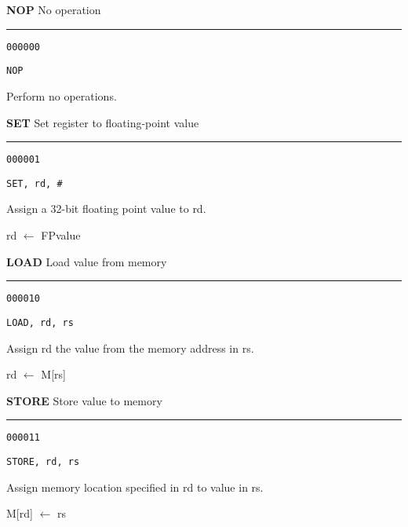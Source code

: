 \documentclass{article}
\begin{document}
\pagebreak


\flushleft
\LARGE\textbf{NOP} \large \hfill No operation

\kern-3pt
\noindent\rule{16.5cm}{0.4pt}
\normalsize

{\large
	 \texttt{000000} \par
	\smallbreak
	 \texttt{NOP} \par
	\smallbreak
	 Perform no operations. \par
}

\bigskip\bigskip

\flushleft
\LARGE\textbf{SET} \large \hfill Set register to floating-point value

\kern-3pt
\noindent\rule{16.5cm}{0.4pt}
\normalsize

{\large
	 \texttt{000001} \par
	\smallbreak
	 \texttt{SET, rd, \#<32-bit FP value>} \par
	\smallbreak
	 Assign a 32-bit floating point value to rd. \par
	\smallbreak
	 rd $\leftarrow$ FPvalue \par
}

\bigskip\bigskip

\flushleft
\LARGE\textbf{LOAD} \large \hfill Load value from memory

\kern-3pt
\noindent\rule{16.5cm}{0.4pt}
\normalsize

{\large
	 \texttt{000010} \par
	\smallbreak
	 \texttt{LOAD, rd, rs} \par
	\smallbreak
	 Assign rd the value from the memory address in rs. \par
	\smallbreak
	 rd $\leftarrow$ M[rs] \par
}

\bigskip\bigskip

\flushleft
\LARGE\textbf{STORE} \large \hfill Store value to memory

\kern-3pt
\noindent\rule{16.5cm}{0.4pt}
\normalsize

{\large
	 \texttt{000011} \par
	\smallbreak
	 \texttt{STORE, rd, rs} \par
	\smallbreak
	 Assign memory location specified in rd to value in rs. \par
	\smallbreak
	 M[rd] $\leftarrow$ rs \par
}
\end{document}
